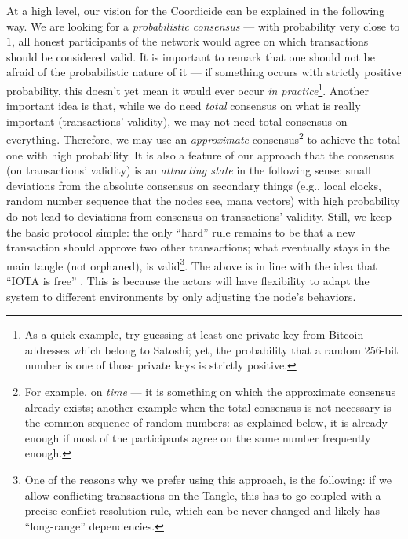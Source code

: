\documentclass[../main.tex]{subfiles}
\begin{document}
At a high level, our vision for the Coordicide can be explained in the following way. 
We are looking for a \emph{probabilistic consensus} --- with probability very close to $1$, all honest participants of the network would agree on which transactions should be considered valid.
It is important to remark that one should not be afraid of the probabilistic nature of it --- if something occurs with strictly
positive probability, this doesn't yet mean it would ever occur 
\emph{in practice}\footnote{As a quick example,
try guessing at least one private key from Bitcoin addresses which belong to Satoshi; yet, the probability that a random 256-bit number is
one of those private keys is strictly positive.}.
Another important idea is that, while we do need \emph{total} consensus 
on what is really important (transactions' validity), we may not need total consensus on everything. Therefore, we may
use an \emph{approximate} consensus\footnote{For example, on \emph{time} 
--- it is something on which the approximate consensus already exists; another example when the total consensus is not necessary is the common sequence of random numbers: as explained below, it is already enough if most of the participants agree on the same number frequently enough.} 
to achieve the total one with high probability. 
It is also a feature of our approach that the consensus (on transactions' validity) is an \emph{attracting state} in the following sense: small deviations from the absolute consensus on secondary things (e.g., local clocks, random number sequence that the nodes see, mana vectors) with high probability do not lead to deviations from consensus on transactions' validity. 
Still, we keep the basic protocol simple: the only ``hard'' rule remains to be that a new transaction should approve two other transactions; 
what eventually stays in the main tangle (not orphaned), 
is valid\footnote{One of the reasons why we prefer using this approach, 
is the following:
if we allow conflicting transactions on the Tangle, 
 this has to go coupled with a precise conflict-resolution rule, 
 which can be never changed and likely has ``long-range'' dependencies.}.
The above is in line with the idea that ``IOTA is free'' \cite{popov2019feelessfree}. 
This is because the actors will have flexibility to adapt the system to different environments by only adjusting the node's behaviors.
\end{document}

